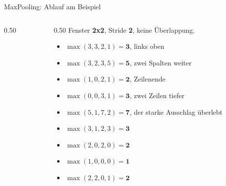 \begin{frame}{MaxPooling: Ablauf am Beispiel}
\begin{columns}
\begin{column}{0.50\linewidth}
{\begin{tikzpicture}
\end{tikzpicture}}
\end{column}
\begin{column}{0.50\linewidth}
\footnotesize
Fenster \textbf{2x2}, Stride \textbf{2}, keine Überlappung.
\begin{itemize}
  \item<1-> $\max(3,3,2,1) = \textbf{3}$, links oben
  \item<2-> $\max(3,2,3,5) = \textbf{5}$, zwei Spalten weiter
  \item<3-> $\max(1,0,2,1) = \textbf{2}$, Zeilenende
  \item<4-> $\max(0,0,3,1) = \textbf{3}$, zwei Zeilen tiefer
  \item<5-> $\max(5,1,7,2) = \textbf{7}$, der starke Ausschlag überlebt
  \item<6-> $\max(3,1,2,3) = \textbf{3}$
  \item<7-> $\max(2,0,2,0) = \textbf{2}$
  \item<8-> $\max(1,0,0,0) = \textbf{1}$
  \item<9-> $\max(2,2,0,1) = \textbf{2}$
\end{itemize}
\end{column}
\end{columns}
\end{frame}

